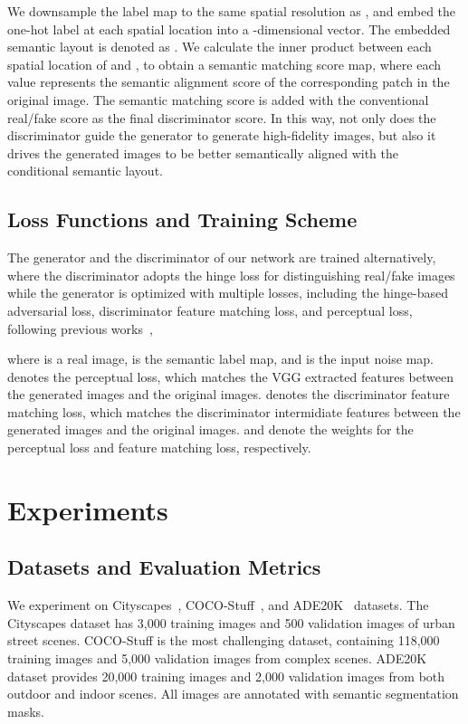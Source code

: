 \documentclass{article}
\begin{document}
We downsample the label map to the same spatial resolution as , and embed the one-hot label at each spatial location into a -dimensional vector. 
The embedded semantic layout is denoted as .
We calculate the inner product between each spatial location of  and , to obtain a semantic matching score map, where each value represents the semantic alignment score of the corresponding patch in the original image.
The semantic matching score is added with the conventional real/fake score as the final discriminator score.
In this way, not only does the discriminator guide the generator to generate high-fidelity images, but also it drives the generated images to be better semantically aligned with the conditional semantic layout.

\subsection{Loss Functions and Training Scheme}
The generator and the discriminator of our network are trained alternatively, where the discriminator adopts the hinge loss for distinguishing real/fake images while the generator is optimized with multiple losses, including the hinge-based adversarial loss, discriminator feature matching loss, and perceptual loss, following previous works~\cite{wang2018high,park2019semantic},

where  is a real image,  is the semantic label map, and  is the input noise map.
 denotes the perceptual loss, which matches the VGG extracted features between the generated images and the original images.
 denotes the discriminator feature matching loss, which matches the discriminator intermidiate features between the generated images and the original images.
 and  denote the weights for the perceptual loss and feature matching loss, respectively.

\section{Experiments}



\subsection{Datasets and Evaluation Metrics}
We experiment on Cityscapes~\cite{cordts2016cityscapes}, COCO-Stuff~\cite{caesar2018coco}, and ADE20K~\cite{zhou2017scene} datasets.
The Cityscapes dataset has 3,000 training images and 500 validation images of urban street scenes.
COCO-Stuff is the most challenging dataset, containing 118,000 training images and 5,000 validation images from complex scenes.
ADE20K dataset provides 20,000 training images and 2,000 validation images from both outdoor and indoor scenes.
All images are annotated with semantic segmentation masks.
\end{document}
